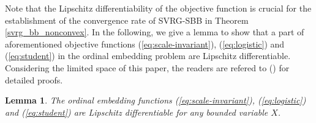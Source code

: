 \documentclass[letterpaper]{article} %
\newtheorem{lemma}{Lemma}
\begin{document}
Note that the Lipschitz differentiability of the objective function is crucial for the establishment of the convergence rate of SVRG-SBB in Theorem \ref{svrg_bb_nonconvex}. In the following, we give a lemma to show that a part of aforementioned objective functions (\ref{eq:scale-invariant}), (\ref{eq:logistic}) and (\ref{eq:student}) in the ordinal embedding problem are Lipschitz differentiable. Considering the limited space of this paper, the readers are refered to (\url{}) for detailed proofs.
	
\begin{lemma}
\label{lemma:1}
The ordinal embedding functions (\ref{eq:scale-invariant}), (\ref{eq:logistic}) and (\ref{eq:student}) are Lipschitz differentiable for any bounded variable $X$.
\end{lemma}
\end{document}
